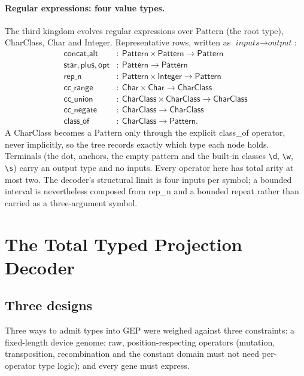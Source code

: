 \documentclass[sigconf,nonacm]{acmart}
\newcommand{\ty}[1]{\textsf{#1}}
\begin{document}
\paragraph{Regular expressions: four value types.} The third kingdom evolves
regular expressions over \ty{Pattern} (the root type), \ty{CharClass},
\ty{Char} and \ty{Integer}. Representative rows, written as $\textit{inputs}\to
\textit{output}$:
\begin{align*}
\ty{concat}, \ty{alt}&:\ \ty{Pattern}\times\ty{Pattern}\to\ty{Pattern}\\
\ty{star}, \ty{plus}, \ty{opt}&:\ \ty{Pattern}\to\ty{Pattern}\\
\ty{rep\_n}&:\ \ty{Pattern}\times\ty{Integer}\to\ty{Pattern}\\
\ty{cc\_range}&:\ \ty{Char}\times\ty{Char}\to\ty{CharClass}\\
\ty{cc\_union}&:\ \ty{CharClass}\times\ty{CharClass}\to\ty{CharClass}\\
\ty{cc\_negate}&:\ \ty{CharClass}\to\ty{CharClass}\\
\ty{class\_of}&:\ \ty{CharClass}\to\ty{Pattern}.
\end{align*}
A \ty{CharClass} becomes a \ty{Pattern} only through the explicit \ty{class\_of}
operator, never implicitly, so the tree records exactly which type each node
holds. Terminals (the dot, anchors, the empty pattern and the built-in classes
\texttt{\textbackslash d}, \texttt{\textbackslash w}, \texttt{\textbackslash s})
carry an output type and no inputs. Every operator here has
total arity at most two. The decoder's structural limit is four inputs per
symbol; a bounded interval is nevertheless
composed from \ty{rep\_n} and a bounded repeat rather than carried as a
three-argument symbol.

\section{The Total Typed Projection Decoder}
\label{sec:decoder}

\subsection{Three designs}

Three ways to admit types into GEP were weighed against three constraints: a
fixed-length device genome; raw, position-respecting operators (mutation,
transposition, recombination and the constant domain must not need per-operator
type logic); and every gene must express.
\end{document}

